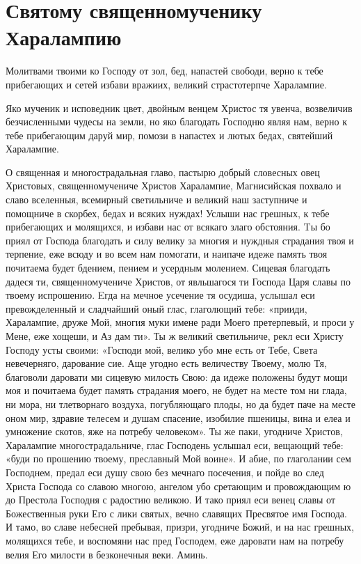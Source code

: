 \section{Святому священномученику Харалампию}\begin{mymulticols}
 


Молитвами твоими ко Господу от зол, бед, напастей свободи, верно к тебе прибегающих и сетей избави вражиих, великий страстотерпче Харалампие.


Яко мученик и исповедник цвет, двойным венцем Христос тя увенча, возвеличив безчисленными чудесы на земли, но яко благодать Господню являя нам, верно к тебе прибегающим даруй мир, помози в напастех и лютых бедах, святейший Харалампие.


О священная и многострадальная главо, пастырю добрый словесных овец Христовых, священномучениче Христов Харалампие, Магнисийская похвало и славо вселенныя, всемирный светильниче и великий наш заступниче и помощниче в скорбех, бедах и всяких нуждах! Услыши нас грешных, к тебе прибегающих и молящихся, и избави нас от всякаго злаго обстояния.  Tы бо приял от Господа благодать и силу велику за многия и нуждныя страдания твоя и терпение, еже всюду и во всем нам помогати, и наипаче идеже память твоя почитаема будет бдением, пением и усердным молением. Сицевая благодать дадеся ти, священномучениче Христов, от явльшагося ти Господа Царя славы по твоему испрошению. Eгда на мечное усечение тя осудиша, услышал еси превожделенный и сладчайший оный глас, глаголющий тебе: «прииди, Харалампие, друже Мой, многия муки имене ради Моего претерпевый, и проси у Мене, еже хощеши, и Аз дам ти». Ты ж великий светильниче, рекл еси Христу Господу усты своими:  «Господи мой, велико убо мне есть от Тебе, Света невечерняго, дарование сие. Аще угодно есть величеству Твоему, молю Тя, благоволи даровати ми сицевую милость Свою: да идеже положены будут мощи моя и почитаема будет память страдания моего, не будет на месте том ни глада, ни мора, ни тлетворнаго воздуха, погубляющаго плоды, но да будет паче на месте оном мир, здравие телесем и душам спасение, изобилие пшеницы, вина и елеа и умножение скотов, яже на потребу человеком». Ты же паки, угодниче Христов, Харалампие многострадальниче, глас Господень услышал еси, вещающий тебе: «буди по прошению твоему, преславный Мой воине». И абие, по глаголании сем Господнем, предал еси душу свою без мечнаго посечения, и пойде во след Христа Господа со славою многою, ангелом убо сретающим и провождающим ю до Престола Господня с радостию великою. И тако приял еси венец славы от Божественныя руки Его с лики святых, вечно славящих Пресвятое имя Господа. И тамо, во славе небесней пребывая, призри, угодниче Божий, и на нас грешных, молящихся тебе, и воспомяни нас пред Господем, еже даровати нам на потребу велия Его милости в безконечныя веки. Аминь.

\end{mymulticols}


